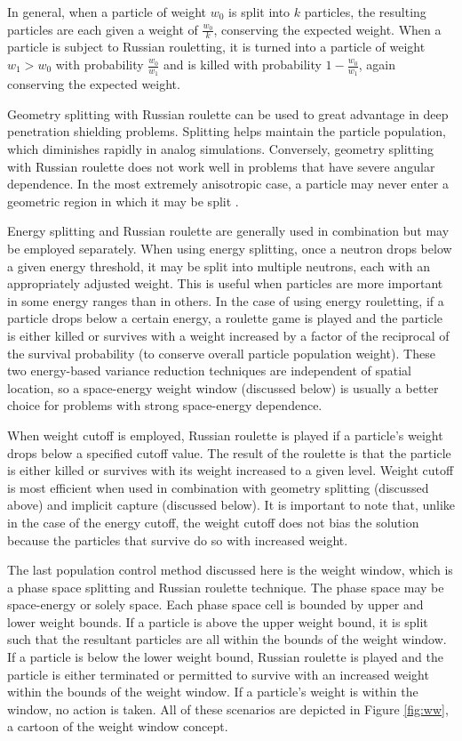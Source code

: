 In general, when a particle of weight $w_0$ is split into $k$ particles, the resulting
particles are each given a weight of $\frac{w_0}{k}$, conserving the expected 
weight. When a particle is subject to Russian rouletting, it is turned into a 
particle of weight $w_1 > w_0$ with probability $\frac{w_0}{w_1}$ and is killed with 
probability $1 - \frac{w_0}{w_1}$, again conserving the expected weight.

Geometry splitting with Russian roulette can be used to great advantage in deep
penetration shielding problems. Splitting helps maintain the particle population, 
which diminishes rapidly in analog simulations. Conversely, geometry splitting with 
Russian roulette does not work well in problems that have severe angular dependence. 
In the most extremely anisotropic case, a particle may never enter a geometric region 
in which it may be split \cite{mcnp}.

Energy splitting and Russian roulette are generally used in combination but may be
employed separately. When using energy splitting, once a neutron drops below a given
energy threshold, it may be split into multiple neutrons, each with an appropriately
adjusted weight. This is useful when particles are more important in some energy 
ranges than in others. In the case of using energy rouletting, if a particle drops 
below a certain energy, a roulette game is played and the particle is either killed 
or survives with a weight increased by a factor of the reciprocal of the survival 
probability (to conserve overall particle population weight). These two energy-based 
variance reduction techniques are independent of spatial location, so a space-energy 
weight window (discussed below) is usually a better choice for problems with strong 
space-energy dependence.

When weight cutoff is employed, Russian roulette is played if a particle's weight 
drops below a specified cutoff value. The result of the roulette is that the particle 
is either killed or survives with its weight increased to a given level. Weight 
cutoff is most efficient when used in combination with geometry splitting (discussed 
above) and implicit capture (discussed below). It is important to note that, unlike 
in the case of the energy cutoff, the weight cutoff does not bias the solution 
because the particles that survive do so with increased weight.

The last population control method discussed here is the weight window, which is a 
phase space splitting and Russian roulette technique. The phase space may be 
space-energy or solely space.
Each phase space cell is bounded by upper and lower weight bounds. If a particle is
above the upper weight bound, it is split such that the resultant particles are all
within the bounds of the weight window. If a particle is below the lower weight bound,
Russian roulette is played and the particle is either terminated or permitted to
survive with an increased weight within the bounds of the weight window. If a 
particle's weight is within the window, no action is taken. All of these scenarios are
depicted in Figure \ref{fig:ww}, a cartoon of the weight window concept.

